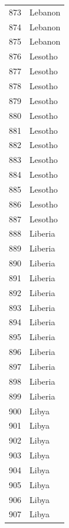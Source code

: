 \documentclass[
  letterpaper,
  DIV=11,
  numbers=noendperiod]{scrreprt}
\begin{document}
\begin{tabular}{ll}
873  &                   Lebanon \\
874  &                   Lebanon \\
875  &                   Lebanon \\
876  &                   Lesotho \\
877  &                   Lesotho \\
878  &                   Lesotho \\
879  &                   Lesotho \\
880  &                   Lesotho \\
881  &                   Lesotho \\
882  &                   Lesotho \\
883  &                   Lesotho \\
884  &                   Lesotho \\
885  &                   Lesotho \\
886  &                   Lesotho \\
887  &                   Lesotho \\
888  &                   Liberia \\
889  &                   Liberia \\
890  &                   Liberia \\
891  &                   Liberia \\
892  &                   Liberia \\
893  &                   Liberia \\
894  &                   Liberia \\
895  &                   Liberia \\
896  &                   Liberia \\
897  &                   Liberia \\
898  &                   Liberia \\
899  &                   Liberia \\
900  &                     Libya \\
901  &                     Libya \\
902  &                     Libya \\
903  &                     Libya \\
904  &                     Libya \\
905  &                     Libya \\
906  &                     Libya \\
907  &                     Libya \\

\end{tabular}
\end{document}
